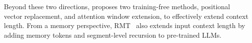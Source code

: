 Beyond these two directions, \citet{dong2024exploring} proposes two training-free methods, positional vector replacement, and attention window extension, to effectively extend context length. From a memory perspective, RMT~\citep{bulatov2023scaling} also extends input context length by adding memory tokens and segment-level recursion to pre-trained LLMs. 
